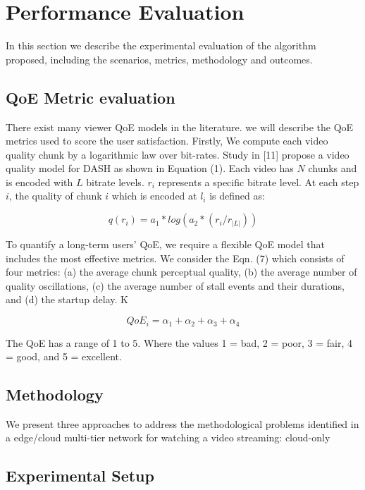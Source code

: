 \section{Performance Evaluation}
\label{sec:results}

In this section we describe the experimental evaluation of the algorithm proposed, including the scenarios, metrics, methodology and outcomes.


\subsection{QoE Metric evaluation}

There exist many viewer QoE models in the literature. we will describe the QoE metrics used to score the user satisfaction. Firstly, We compute each video quality chunk by a logarithmic law over bit-rates. Study in [11] propose a video quality model for DASH as shown in Equation (1). Each video has $N$ chunks and is encoded with $L$ bitrate levels. $r_i$ represents a specific bitrate level. At each step $i$, the quality of chunk $i$ which is encoded at $l_i$ is defined as:

$$
q(r_i) = a_1 * log(a_2 * (r_i/ r_{|L|}))
$$

To quantify a long-term users' QoE, we require a flexible QoE model that includes the most effective metrics. 
We consider the Eqn. (7) which consists of four metrics: (a) the average chunk perceptual quality, (b) the average number of quality oscillations, (c) the average number of stall events and their durations, and (d) the startup delay. K

\begin{equation}\label{qoe-equation}
QoE_i = \alpha_1 + \alpha_2 + \alpha_3 + \alpha_4
\end{equation}


The QoE has a range of 1 to 5. Where the values 1 = bad, 2 = poor, 3 = fair, 4 = good, and 5 = excellent.
 
 
\subsection{Methodology}

We present three approaches to address the methodological problems identified in a edge/cloud multi-tier network for watching a video streaming: cloud-only 

\subsection{Experimental Setup}

